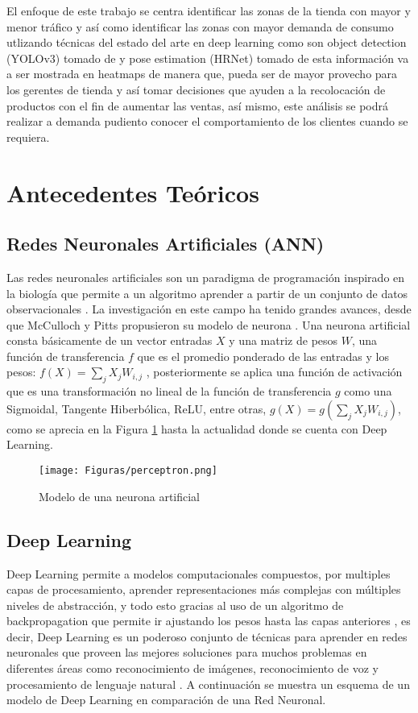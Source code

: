 \documentclass[conference]{IEEEtran}
\begin{document}
El enfoque de este trabajo se centra identificar las zonas de la tienda con mayor y menor tráfico y así como identificar las zonas con mayor demanda de consumo utlizando técnicas del estado del arte en deep learning como son object detection (YOLOv3) tomado de \cite{redmon2018yolov3} y pose estimation (HRNet) tomado de \cite{sun2019deep} esta información va a ser mostrada en heatmaps de manera que, pueda ser de mayor provecho para los gerentes de tienda y así tomar decisiones que ayuden a la recolocación de productos con el fin de aumentar las ventas, así mismo, este análisis se podrá realizar a demanda pudiento conocer el comportamiento de los clientes cuando se requiera.

\section{Antecedentes Teóricos}

\subsection{Redes Neuronales Artificiales (ANN)}
Las redes neuronales artificiales son un paradigma de programación inspirado en la biología que permite a un algoritmo aprender a partir de un conjunto de datos observacionales \cite{nielsen2018neural}. La investigación en este campo ha tenido grandes avances, desde que McCulloch y Pitts propusieron su modelo de neurona \cite{mcculloch1943logical}. Una neurona artificial consta básicamente de un vector entradas $X$ y una matriz de pesos $W$, una función de transferencia $f$  que es el promedio ponderado de las entradas y los pesos: $ f(X) = \sum_{j} X_j W_{i,j}$ , posteriormente se  aplica una función de activación que es una transformación no lineal de la función de transferencia $g$ como una Sigmoidal, Tangente Hiberbólica, ReLU, entre otras, $ g(X) = g(\sum_{j} X_j W_{i,j})$, como se aprecia en la Figura \ref{fig:perceptron} hasta la actualidad donde se cuenta con Deep Learning.
\begin{figure}[hbtp]
\centering
\texttt{[image: Figuras/perceptron.png]}
\caption{Modelo de una neurona artificial}
\label{fig:perceptron}
\end{figure}

\subsection{Deep Learning}

Deep Learning permite a modelos computacionales compuestos, por multiples capas de procesamiento, aprender representaciones más complejas con múltiples niveles de abstracción, y todo esto gracias al uso de un algoritmo de backpropagation que permite ir ajustando los pesos hasta las capas anteriores \cite{lecun2015deep}, es decir, Deep Learning es un poderoso conjunto de técnicas para aprender en redes neuronales que proveen las mejores soluciones para muchos problemas en diferentes áreas como reconocimiento de imágenes, reconocimiento de voz y procesamiento de lenguaje natural \cite{nielsen2018neural}. A continuación se muestra un esquema de un modelo de Deep Learning en comparación de una Red Neuronal.
\end{document}
